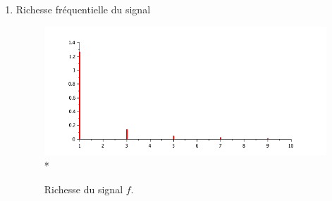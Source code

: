 \documentclass[a4paper,12pt]{report}
\begin{document}
\begin{enumerate}
\begin{enumerate}
			\item Richesse fréquentielle du signal
			\begin{figure}[h!]
				\centering
				\includegraphics[scale=0.6]{ex1_fig3_2.png}\\*
				\caption{\label{ex1_figure3_2}Richesse du signal $f$.}
			\end{figure}\\
		\end{enumerate}
				\newpage
		

\end{enumerate}
\end{document}
